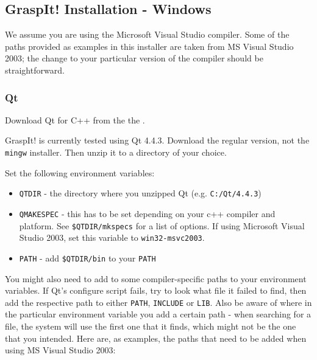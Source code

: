 \subsection{GraspIt! Installation - Windows}

We assume you are using the Microsoft Visual Studio compiler. Some of
the paths provided as examples in this installer are taken from MS
Visual Studio 2003; the change to your particular version of the
compiler should be straightforward.

\subsubsection{Qt}

Download Qt for C++ from the the .

GraspIt! is currently tested using Qt 4.4.3. Download the regular
version, not the \texttt{mingw} installer. Then unzip it to a
directory of your choice.

Set the following environment variables:

\begin{itemize}
\item \texttt{QTDIR} - the directory where you unzipped Qt (e.g. \texttt{C:/Qt/4.4.3})
\item \texttt{QMAKESPEC} - this has to be set depending on your c++
  compiler and platform. See \texttt{\$QTDIR/mkspecs} for a list of
  options. If using Microsoft Visual Studio 2003, set this variable to
  \texttt{win32-msvc2003}.
\item \texttt{PATH} - add \texttt{\$QTDIR/bin} to your \texttt{PATH}
\end{itemize}

You might also need to add to some compiler-specific paths to your
environment variables. If Qt's configure script fails, try to look
what file it failed to find, then add the respective path to either
\texttt{PATH}, \texttt{INCLUDE} or \texttt{LIB}. Also be aware of where in the particular environment variable you add a certain path - when searching for a
file, the system will use the first one that it finds, which might not
be the one that you intended. Here are, as examples, the paths that
need to be added when using MS Visual Studio 2003:

